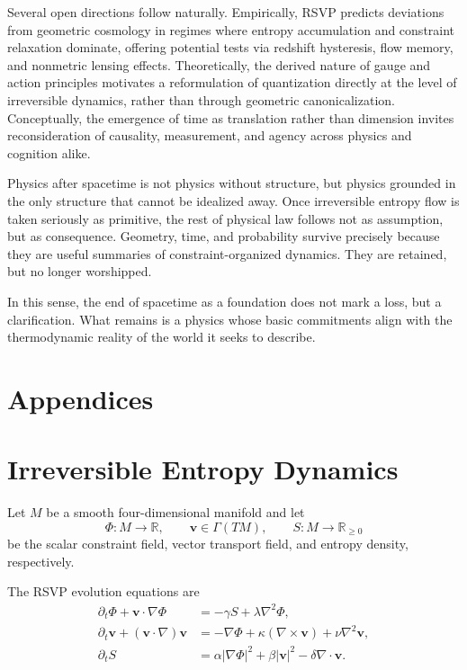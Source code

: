 \documentclass[11pt]{article}
\begin{document}
Several open directions follow naturally. Empirically, RSVP predicts deviations from geometric cosmology in regimes where entropy accumulation and constraint relaxation dominate, offering potential tests via redshift hysteresis, flow memory, and nonmetric lensing effects. Theoretically, the derived nature of gauge and action principles motivates a reformulation of quantization directly at the level of irreversible dynamics, rather than through geometric canonicalization. Conceptually, the emergence of time as translation rather than dimension invites reconsideration of causality, measurement, and agency across physics and cognition alike.

Physics after spacetime is not physics without structure, but physics grounded in the only structure that cannot be idealized away. Once irreversible entropy flow is taken seriously as primitive, the rest of physical law follows not as assumption, but as consequence. Geometry, time, and probability survive precisely because they are useful summaries of constraint-organized dynamics. They are retained, but no longer worshipped.

In this sense, the end of spacetime as a foundation does not mark a loss, but a clarification. What remains is a physics whose basic commitments align with the thermodynamic reality of the world it seeks to describe.

\newpage
\section*{Appendices}

\appendix
\section{Irreversible Entropy Dynamics}

Let $M$ be a smooth four-dimensional manifold and let
\[
\Phi : M \to \mathbb{R}, \qquad 
\mathbf{v} \in \Gamma(TM), \qquad
S : M \to \mathbb{R}_{\ge 0}
\]
be the scalar constraint field, vector transport field, and entropy density, respectively.

The RSVP evolution equations are
\begin{align}
\partial_t \Phi + \mathbf{v}\cdot\nabla\Phi &= -\gamma S + \lambda \nabla^2\Phi, \label{A1}\\
\partial_t \mathbf{v} + (\mathbf{v}\cdot\nabla)\mathbf{v} &= -\nabla\Phi + \kappa(\nabla\times\mathbf{v}) + \nu\nabla^2\mathbf{v}, \label{A2}\\
\partial_t S &= \alpha|\nabla\Phi|^2 + \beta|\mathbf{v}|^2 - \delta\nabla\cdot\mathbf{v}. \label{A3}
\end{align}
\end{document}
